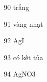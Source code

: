 \begin{loigiaibt}{90}
 trắng
\end{loigiaibt}
\begin{loigiaibt}{91}
 vàng nhạt
\end{loigiaibt}
\begin{loigiaibt}{92}
 AgI
\end{loigiaibt}
\begin{loigiaibt}{93}
 có kết tủa
\end{loigiaibt}
\begin{loigiaibt}{94}
 AgNO3
\end{loigiaibt}
